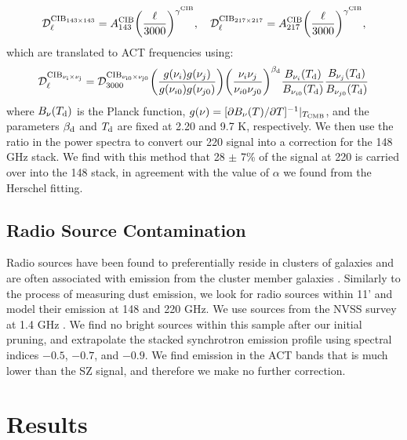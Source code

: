 \documentclass[a4paper,fleqn,usenatbib]{mnras}
\begin{document}
\begin{equation}
\mathcal{D}_{\ell}^{\rm CIB_{143 \times 143}} = A^{\rm CIB}_{143} \bigg(\frac{\ell}{3000}\bigg)^{\gamma^{\rm CIB}}, \quad
\mathcal{D}_{\ell}^{\rm CIB_{217 \times 217}} = A^{\rm CIB}_{217} \bigg(\frac{\ell}{3000}\bigg)^{\gamma^{\rm CIB}},
\end{equation}
which are translated to ACT frequencies using:
\begin{equation}
\mathcal{D}^{\rm CIB_{\nu_{i} \times \nu_{j}}}_{\ell} = \mathcal{D}^{\rm CIB_{\nu_{i0} \times \nu_{j0}}}_{3000} \bigg( \frac{g(\nu_{i})g(\nu_{j})}{g(\nu_{i0})g(\nu_{j0})} \bigg) \bigg( \frac{\nu_{i} \nu_{j}}{\nu_{i0} \nu_{j0}} \bigg)^{\beta_{\rm d}} \frac{B_{\nu_{i}}(T_{\rm d})}{B_{\nu_{i0}}(T_{\rm d})} \frac{B_{\nu_{j}}(T_{\rm d})}{B_{\nu_{j0}}(T_{\rm d})}
\end{equation}
\newline 
where $B_{\nu}(T_{\rm d})$ is the Planck function, $g(\nu) = [\partial B_{\nu}(T)/\partial T]^{-1}|_{T_{\rm CMB}}$, and the parameters $\beta_{\rm d}$ and $T_{\rm d}$ are fixed at 2.20 and 9.7 K, respectively.
We then use the ratio in the power spectra to convert our 220 signal into a correction for the 148 GHz stack. We find with this method that 28 $\pm$ 7\% of the signal at 220 is carried over into the 148 stack, in agreement with the value of $\alpha$ we found from the Herschel fitting.



\subsection{Radio Source Contamination}
Radio sources have been found to preferentially reside in clusters of galaxies and are often associated with emission from the cluster member galaxies \citep{2002ApJ...580...36H,2007ApJS..170...71L,2007AJ....134..897C,2009ApJ...694..992L}. Similarly to the process of measuring dust emission, we look for radio sources within 11' and model their emission at 148 and 220 GHz. We use sources from the NVSS survey at 1.4 GHz \citep{1998AJ....115.1693C}. We find no bright sources within this sample after our initial pruning, and extrapolate the stacked synchrotron emission profile using spectral indices $-0.5$, $-0.7$, and $-0.9$. We find emission in the ACT bands that is much lower than the SZ signal, and therefore we make no further correction.



\section{Results} \label{sec:results}
\end{document}
